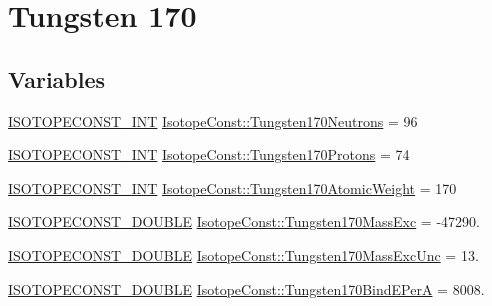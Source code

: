 \hypertarget{group___isotope_const-_tungsten-_w170}{}\section{Tungsten 170}
\label{group___isotope_const-_tungsten-_w170}
\subsection*{Variables}
\begin{DoxyCompactItemize}
\item 
\mbox{\hyperlink{group___isotope_const-_macros_ga5f18360b3e99483a35c32d789e62621c}{I\+S\+O\+T\+O\+P\+E\+C\+O\+N\+S\+T\+\_\+\+I\+NT}} \mbox{\hyperlink{group___isotope_const-_tungsten-_w170_gab6574abcd82f5a3deadacd54ed9ae6c1}{Isotope\+Const\+::\+Tungsten170\+Neutrons}} = 96
\item 
\mbox{\hyperlink{group___isotope_const-_macros_ga5f18360b3e99483a35c32d789e62621c}{I\+S\+O\+T\+O\+P\+E\+C\+O\+N\+S\+T\+\_\+\+I\+NT}} \mbox{\hyperlink{group___isotope_const-_tungsten-_w170_gaede1085f73994bfa66171068767b2e98}{Isotope\+Const\+::\+Tungsten170\+Protons}} = 74
\item 
\mbox{\hyperlink{group___isotope_const-_macros_ga5f18360b3e99483a35c32d789e62621c}{I\+S\+O\+T\+O\+P\+E\+C\+O\+N\+S\+T\+\_\+\+I\+NT}} \mbox{\hyperlink{group___isotope_const-_tungsten-_w170_ga3981fdabda3e127cd873873fe976ad72}{Isotope\+Const\+::\+Tungsten170\+Atomic\+Weight}} = 170
\item 
\mbox{\hyperlink{group___isotope_const-_macros_ga8f45a7272ce02c0b4c65c44636ed719a}{I\+S\+O\+T\+O\+P\+E\+C\+O\+N\+S\+T\+\_\+\+D\+O\+U\+B\+LE}} \mbox{\hyperlink{group___isotope_const-_tungsten-_w170_ga75d927a54fac4a8fd4908f5bec078b59}{Isotope\+Const\+::\+Tungsten170\+Mass\+Exc}} = -\/47290.
\item 
\mbox{\hyperlink{group___isotope_const-_macros_ga8f45a7272ce02c0b4c65c44636ed719a}{I\+S\+O\+T\+O\+P\+E\+C\+O\+N\+S\+T\+\_\+\+D\+O\+U\+B\+LE}} \mbox{\hyperlink{group___isotope_const-_tungsten-_w170_ga65351265bb313e6eba0ce9d950ea4d0f}{Isotope\+Const\+::\+Tungsten170\+Mass\+Exc\+Unc}} = 13.
\item 
\mbox{\hyperlink{group___isotope_const-_macros_ga8f45a7272ce02c0b4c65c44636ed719a}{I\+S\+O\+T\+O\+P\+E\+C\+O\+N\+S\+T\+\_\+\+D\+O\+U\+B\+LE}} \mbox{\hyperlink{group___isotope_const-_tungsten-_w170_ga9556bd0500cb8e52bbf3ca7395837109}{Isotope\+Const\+::\+Tungsten170\+Bind\+E\+PerA}} = 8008.
\item 

\end{DoxyCompactItemize}
